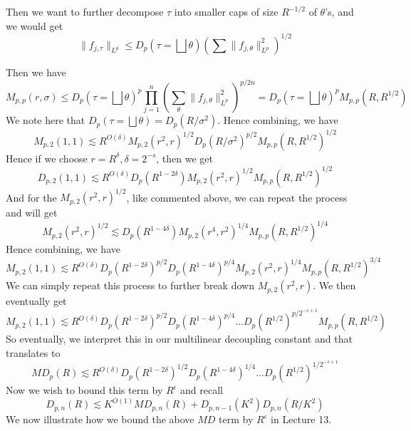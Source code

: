 Then we want to further decompose $\tau$ into smaller caps of size $R^{-1/2}$ of $\theta$'s, and we would get
\begin{equation*}
    \|f_{j,\tau}\|_{L^p}\leq D_p(\tau=\bigsqcup\theta)\left(\sum\|f_{j,\theta}\|_{L^p}^2 \right)^{1/2}
\end{equation*}

Then we have
\begin{equation*}
    M_{p,p}(r,\sigma)\leq D_p(\tau=\bigsqcup\theta)^p\prod_{j=1}^n\left(\sum_{\theta}\|f_{j,\theta}\|_{L^p}^2 \right)^{p/2n}=D_p(\tau=\bigsqcup\theta)^pM_{p,p}(R,R^{1/2})
\end{equation*}
We note here that $D_p(\tau=\bigsqcup\theta)=D_p(R/\sigma^2)$.
Hence combining, we have
\begin{equation*}
    M_{p,2}(1,1)\lesssim R^{O(\delta)}M_{p,2}(r^2,r)^{1/2}D_p(R/\sigma^2)^{p/2}M_{p,p}(R,R^{1/2})^{1/2}
\end{equation*}
Hence if we choose $r=R^\delta, \delta=2^{-s}$, then we get
\begin{equation*}
    D_{p,2}(1,1)\lesssim R^{O(\delta)}D_p(R^{1-2\delta})M_{p,2}(r^2, r)^{1/2}M_{p,p}(R, R^{1/2})^{1/2}
\end{equation*}
And for the $M_{p,2}(r^2, r)^{1/2}$, like commented above, we can repeat the process and will get
\begin{equation*}
    M_{p,2}(r^2, r)^{1/2}\lesssim D_p(R^{1-4\delta})M_{p,2}(r^4, r^2)^{1/4}M_{p,p}(R,R^{1/2})^{1/4}
\end{equation*}
Hence combining, we have
\begin{equation*}
    M_{p,2}(1,1)\lesssim R^{O(\delta)}D_p(R^{1-2\delta})^{p/2}D_p(R^{1-4\delta})^{p/4}M_{p,2}(r^2,r)^{1/4}M_{p,p}(R,R^{1/2})^{3/4}
\end{equation*}
We can simply repeat this process to further break down $M_{p,2}(r^2, r)$. We then eventually get 
\begin{equation*}
    M_{p,2}(1,1)\lesssim R^{O(\delta)}D_p(R^{1-2\delta})^{p/2}D_p(R^{1-4\delta})^{p/4}...D_p(R^{1/2})^{p/2^{-s+1}}M_{p,p}(R,R^{1/2})
\end{equation*}
So eventually, we interpret this in our multilinear decoupling constant and that translates to
\begin{equation*}
    MD_{p}(R)\lesssim R^{O(\delta)}D_p(R^{1-2\delta})^{1/2}D_p(R^{1-4\delta})^{1/4}...D_p(R^{1/2})^{1/2^{-s+1}}
\end{equation*}
Now we wish to bound this term by $R^\epsilon$ and recall
\begin{equation*}
    D_{p,n}(R)\lesssim K^{O(1)}MD_{p,n}(R)+D_{p,n-1}(K^2)D_{p,n}(R/K^2)
\end{equation*}
We now illustrate how we bound the above $MD$ term by $R^\epsilon$ in Lecture 13.